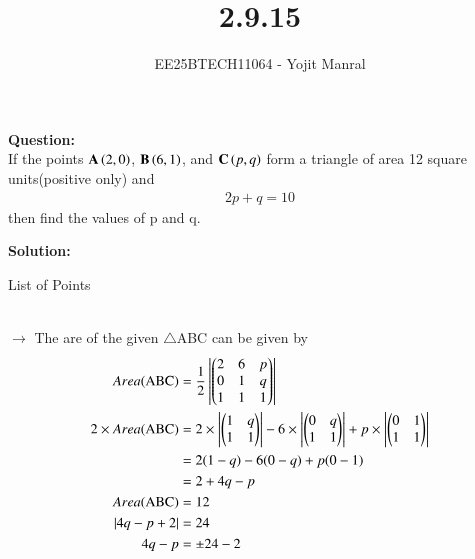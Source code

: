\documentclass[journal]{IEEEtran}
\begin{document}

\vspace{3cm}

\title{2.9.15}
\author{EE25BTECH11064 - Yojit Manral}

\maketitle
{\let\newpage\relax\maketitle}
\renewcommand{\thefigure}{\theenumi}
\renewcommand{\thetable}{\theenumi}
\setlength{\intextsep}{10pt} %

\textbf{Question:}\\
If the points $\mathbf{A}\left(2,0\right)$, $\mathbf{B}\left(6,1\right)$, and $\mathbf{C}\left(p,q\right)$ form a triangle of area 12 square units(positive only) and
\begin{align}
    2p + q = 10
\end{align}
then find the values of p and q.

\textbf{Solution:}\\
\begin{table}[h!]    
  \centering
  
  \caption{List of Points}
  \label{Table_1}
\end{table}\\

$\rightarrow$ The are of the given $\triangle$ABC can be given by
\begin{align}
    Area(\text{ABC}) &= \frac{1}{2} \left| \begin{pmatrix}2 & 6 & p\\0& 1 & q\\1 & 1 & 1\end{pmatrix} \right| \\
    2 \times Area(\text{ABC}) &= 2 \times \left| \begin{pmatrix}1 & q\\1 & 1\end{pmatrix} \right| - 6 \times \left| \begin{pmatrix}0 & q\\1 & 1\end{pmatrix} \right| + p \times \left| \begin{pmatrix}0 & 1\\1 & 1\end{pmatrix} \right| \\
    &= 2(1-q) - 6(0-q) + p(0-1) \\
    &= 2 + 4q - p \\
    Area(\text{ABC}) &= 12 \\
    \left| 4q -p + 2 \right| &= 24 \\
    4q - p &= \pm 24 - 2
\end{align}
\end{document}
